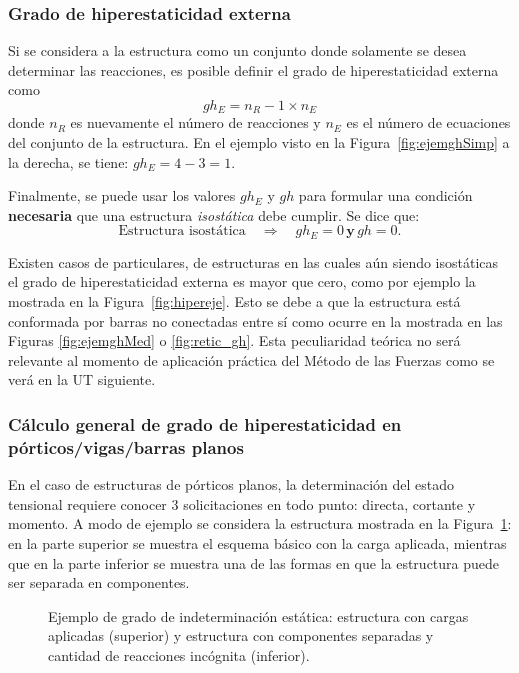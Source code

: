 \subsubsection{Grado de hiperestaticidad externa}
%
Si se considera a la estructura como un conjunto donde solamente se desea determinar las reacciones, es posible definir el grado de hiperestaticidad externa como
%
\begin{equation}
	gh_E = n_{R} - 1 \times n_{E}
\end{equation}
%
donde $n_R$ es nuevamente el número de reacciones y $n_E$ es el número de ecuaciones del conjunto de la estructura. %
%
En el ejemplo visto en la Figura~\ref{fig:ejemghSimp} a la derecha, se tiene: $gh_E = 4 - 3 = 1$. %



Finalmente, se puede usar los valores $gh_E$ y $gh$ para formular una condición \textbf{necesaria} que una estructura \textit{isostática} debe cumplir. %
%
Se dice que:
%
$$
\boxed{
	\text{Estructura isostática} \quad \Rightarrow \quad gh_E = 0 \, \textbf{y} \, gh = 0.
}%
$$


Existen casos de particulares, de estructuras en las cuales aún siendo isostáticas el grado de hiperestaticidad externa es mayor que cero, como por ejemplo la mostrada en la Figura~\ref{fig:hipereje}. %
%
Esto se debe a que la estructura está conformada por barras no conectadas entre sí como ocurre en la mostrada en las Figuras \ref{fig:ejemghMed} o \ref{fig:retic_gh}. %
%
Esta peculiaridad teórica no será relevante al momento de aplicación práctica del Método de las Fuerzas como se verá en la UT siguiente.


\subsubsection{Cálculo general de grado de hiperestaticidad en pórticos/vigas/barras planos}

En el caso de estructuras de pórticos planos, la determinación del estado tensional requiere conocer 3 solicitaciones en todo punto: directa, cortante y momento. %
%
A modo de ejemplo se considera la estructura mostrada en la Figura~\ref{fig:gerb}: en la parte superior se muestra el esquema básico con la carga aplicada, mientras que en la parte inferior se muestra una de las formas en que la estructura puede ser separada en componentes. 
%
\begin{figure}[htb]
	\centering
	\def\svgwidth{0.7\textwidth}
	
	\caption{Ejemplo de grado de indeterminación estática: estructura con cargas aplicadas (superior) y estructura con componentes separadas y cantidad de reacciones incógnita (inferior).}
	\label{fig:gerb}
\end{figure}

